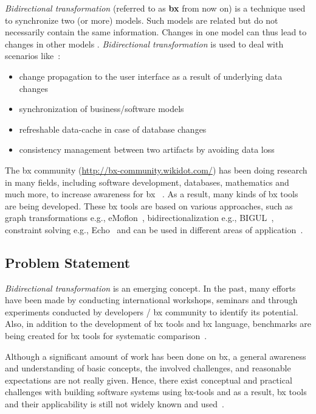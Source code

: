 \textit{Bidirectional transformation} (referred to as \textbf{bx} from now on) is a technique used to synchronize two (or more) models. Such models are related but do not necessarily contain the same information. Changes in one model can thus lead to changes in other models \cite{bx-grace}.
\newline\newline\textit{Bidirectional transformation} is used to deal with scenarios like~\cite{bx-theoryandappl}:\\

\begin{itemize}
	\item {change propagation to the user interface as a result of underlying data changes}	
	\item {synchronization of business/software models}
	\item {refreshable data-cache in case of database changes}
	\item {consistency management between two artifacts by avoiding data loss}
\end{itemize}

The bx community (\url{http://bx-community.wikidot.com/}) has been doing research in many fields, including software development, databases, mathematics and much more, to increase awareness for bx ~\cite{bx-grace}\cite{bx-dagstuhl}. As a result, many kinds of bx tools are being developed. These bx tools are based on various approaches, such as graph transformations e.g., eMoflon~\cite{emoflon-part4}, bidirectionalization e.g., BIGUL~\cite{bigul}, constraint solving e.g., Echo~\cite{echo} and can be used in different areas of application~\cite{bx-community}.

\subsection{Problem Statement}\label{subsec:probstmt}
\textit{Bidirectional transformation} is an emerging concept. In the past, many efforts have been made by conducting international workshops, seminars and through experiments conducted by developers / bx community to identify its potential. Also, in addition to the development of bx tools and bx language, benchmarks are being created for bx tools for systematic comparison~\cite{benchmark-BX}.

Although a significant amount of work has been done on bx, a general awareness and understanding of basic concepts, the involved challenges, and reasonable expectations are not really given. Hence, there exist conceptual and practical challenges with building software systems using bx-tools and as a result, bx tools and their applicability is still not widely known and used~\cite{bx-theoryandappl}.

